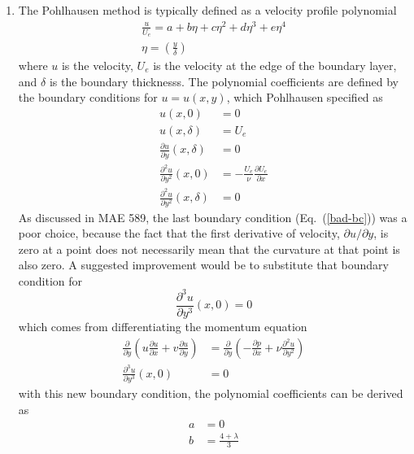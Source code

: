 \documentclass[a4paper]{report}
\newcommand{\eref}[1]{Eq.~(\ref{#1})}
\newcommand{\pd}[2]{\frac{\partial #1}{\partial #2}}
\newcommand{\pnd}[3]{\frac{\partial^{#3} #1}{\partial #2^{#3}}}
\begin{document}
\begin{enumerate}
  \item The Pohlhausen method is typically defined as a velocity profile polynomial
    \begin{equation}
      \begin{gathered}
        \frac{u}{U_e} = a + b\eta + c\eta^2 + d\eta^3 + e\eta^4 \\
        \eta = \left( \frac{y}{\delta} \right)
      \end{gathered}
      \label{u-polynomial}
    \end{equation}
    where $u$ is the velocity, $U_e$ is the velocity at the edge of the
    boundary layer, and $\delta$ is the boundary thicknesss.  The polynomial
    coefficients are defined by the boundary conditions for $u = u(x,y)$, which
    Pohlhausen specified as
    \begin{align}
      u(x,0) &= 0 \\
      u(x,\delta) &= U_e \\
      \pd{u}{y}(x,\delta) &= 0 \\
      \pnd{u}{y}{2}(x,0) &=
      -\frac{U_e}{\nu}\pd{U_e}{x} \\
      \pnd{u}{y}{2}(x,\delta) &= 0 \label{bad-bc}
    \end{align}
    As discussed in MAE 589, the last boundary condition (\eref{bad-bc}) was a
    poor choice, because the fact that the first derivative of velocity, $\partial
    u/\partial y$, is zero at a point does not necessarily mean that the
    curvature at that point is also zero.  A suggested improvement would be to
    substitute that boundary condition for
    \begin{equation}
      \pnd{u}{y}{3}(x,0) = 0
      \label{improved-bc}
    \end{equation}
    which comes from differentiating the momentum equation
    \begin{equation}
      \begin{aligned}
        \pd{}{y}\left( u \pd{u}{x} + v\pd{u}{y}\right) &= \pd{}{y}\left(
        -\pd{p}{x} + \nu \pnd{u}{y}{2} \right) \\
        \pnd{u}{y}{3}(x,0) &= 0
      \end{aligned}
      \label{bc-deriv}
    \end{equation}
    with this new boundary condition, the polynomial coefficients can be derived
    as
    \begin{align}
      a &= 0 \\
      b &= \frac{4 + \lambda}{3} \\

\end{align}
\end{enumerate}
\end{document}
